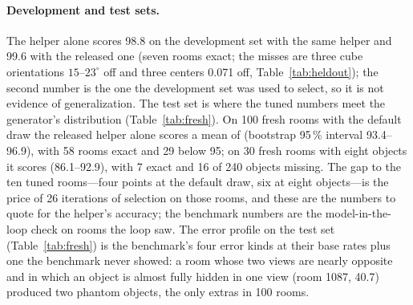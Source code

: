 \documentclass[10pt,a4paper]{article}
\begin{document}
\begin{table}[t]
\centering\small
\caption{Helper alone on seeds 101--110, with the deployed VLM + helper runs of Section~\ref{sec:ablation} for comparison. ``Helper alone'' runs \texttt{solve\_all} offline on the same two JPEGs with no model; ``same helper'' is commit \texttt{3744bdf} (the one in the VLM + helper runs), ``released helper'' \texttt{d3b8a2d}. Offline time on two shared vCPUs is 8--21\,s per room and is not comparable to the sandbox.}
\label{tab:ablation}

\end{table}

\paragraph{Development and test sets.}
The helper alone scores 98.8 on the development set with the same helper and 99.6 with the released one (seven rooms exact; the misses are three cube orientations $15$--$23^\circ$ off and three centers 0.071 off, Table~\ref{tab:heldout}); the second number is the one the development set was used to select, so it is not evidence of generalization. The test set is where the tuned numbers meet the generator's distribution (Table~\ref{tab:fresh}). On 100 fresh rooms with the default draw the released helper alone scores a mean of \unskip{} (bootstrap 95\,\% interval 93.4--96.9), with 58 rooms exact and 29 below 95; on 30 fresh rooms with eight objects it scores \unskip{} (86.1--92.9), with 7 exact and 16 of 240 objects missing. The gap to the ten tuned rooms---four points at the default draw, six at eight objects---is the price of 26 iterations of selection on those rooms, and these are the numbers to quote for the helper's accuracy; the benchmark numbers are the model-in-the-loop check on rooms the loop saw. The error profile on the test set (Table~\ref{tab:fresh}) is the benchmark's four error kinds at their base rates plus one the benchmark never showed: a room whose two views are nearly opposite and in which an object is almost fully hidden in one view (room 1087, 40.7) produced two phantom objects, the only extras in 100 rooms.

\begin{table}[t]
\centering\small
\caption{Development set, seeds 201--210, helper alone with the released helper (commit \texttt{d3b8a2d}), same scorer, offline. The API was never run on these rooms; see Section~\ref{sec:setting} for how the set was used during tuning.}
\label{tab:heldout}

\end{table}
\end{document}
